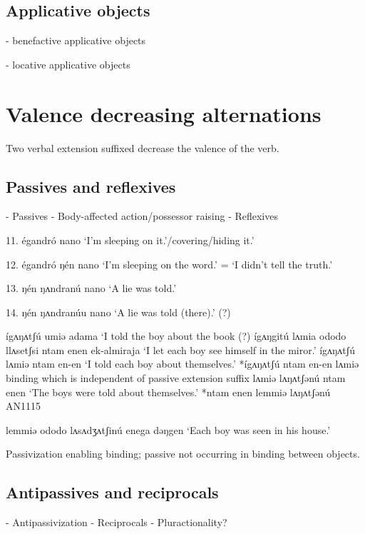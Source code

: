 \subsection{Applicative objects}\label{sec:ch12:applicative}

- benefactive applicative objects

- locative applicative objects

\section{Valence decreasing alternations}\label{sec:ch12:decreasing}

Two verbal extension suffixed decrease the valence of the verb.

\subsection{Passives and reflexives}\label{sec:ch12:passive}

- Passives
- Body-affected action/possessor raising
- Reflexives


11. égandró nano	‘I’m sleeping on it.’/covering/hiding it.’

12. égandró ŋén nano	‘I’m sleeping on the word.’ = ‘I didn’t tell the truth.’

13. ŋén ŋʌndranú nano	‘A lie was told.’

14. ŋén ŋʌndranúu nano	‘A lie was told (there).’ (?)

ígʌŋʌtʃú umiə adama					‘I told the boy about the book (?)
ígʌŋgitú lʌmia ododo llʌsetʃsi ntam enen ek-almiraja	‘I let each boy see himself in the miror.’
ígʌŋʌtʃú lʌmiə ntam en-en				‘I told each boy about themselves.’
*ígʌŋʌtʃú ntam en-en lʌmiə				
 binding which is independent of passive extension suffix
lʌmiə lʌŋʌtʃənú ntam enen				‘The boys were told about themselves.’
*ntam enen lemmiə lʌŋʌtʃənú		AN1115		
 
lemmiə ododo lʌsʌdʒʌtʃinú enega dəŋgen		‘Each boy was seen in his house.’

Passivization enabling binding; passive not occurring in binding between objects.
 

\subsection{Antipassives and reciprocals}\label{sec:ch12:antipassive}

- Antipassivization
- Reciprocals
- Pluractionality?

